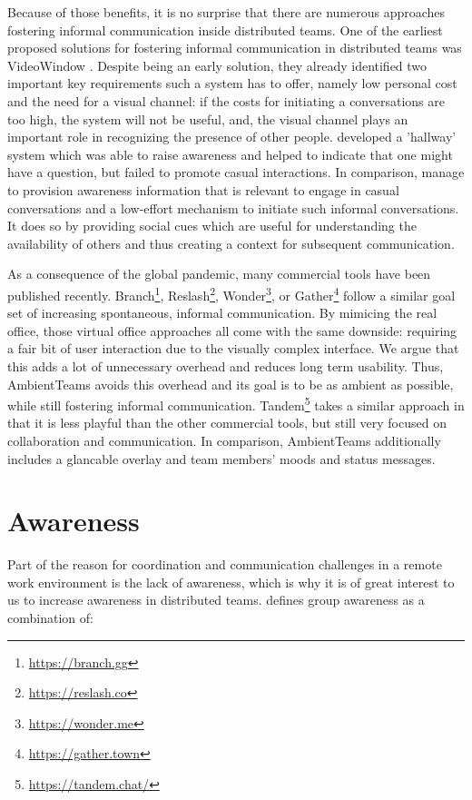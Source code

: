 Because of those benefits, it is no surprise that there are numerous approaches fostering informal communication inside distributed teams. One of the earliest proposed solutions for fostering informal communication in distributed teams was VideoWindow \autocite{fish1990videowindow}. Despite being an early solution, they already identified two important key requirements such a system has to offer, namely low personal cost and the need for a visual channel: if the costs for initiating a conversations are too high, the system will not be useful, and, the visual channel plays an important role in recognizing the presence of other people. \textcite{sasaki1999video} developed a 'hallway' system which was able to raise awareness and helped to indicate that one might have a question, but failed to promote casual interactions. In comparison, \textcite{lou2012presencescape} manage to provision awareness information that is relevant to engage in casual conversations and a low-effort mechanism to initiate such informal conversations. It does so by providing social cues which are useful for understanding the availability of others and thus creating a context for subsequent communication.

As a consequence of the global pandemic, many commercial tools have been published recently. Branch\footnote{\url{https://branch.gg}}, Reslash\footnote{\url{https://reslash.co}}, Wonder\footnote{\url{https://wonder.me}}, or Gather\footnote{\url{https://gather.town}} follow a similar goal set of increasing spontaneous, informal communication. By mimicing the real office, those virtual office approaches all come with the same downside: requiring a fair bit of user interaction due to the visually complex interface. We argue that this adds a lot of unnecessary overhead and reduces long term usability. Thus, AmbientTeams avoids this overhead and its goal is to be as ambient as possible, while still fostering informal communication. Tandem\footnote{\url{https://tandem.chat/}} takes a similar approach in that it is less playful than the other commercial tools, but still very focused on collaboration and communication. In comparison, AmbientTeams additionally includes a glancable overlay and team members' moods and status messages.


\section{Awareness}
Part of the reason for coordination and communication challenges in a remote work environment is the lack of awareness, which is why it is of great interest to us to increase awareness in distributed teams. \textcite{gutwin1996workspace} defines group awareness as a combination of:

